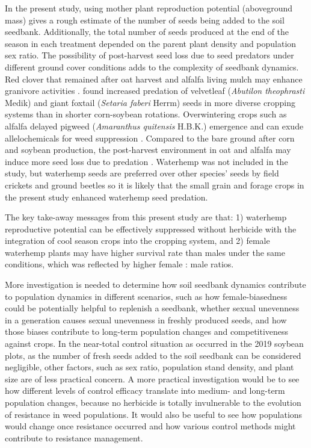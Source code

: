 \documentclass[utf8]{frontiersSCNS}
\begin{document}
In the present study, using mother plant reproduction potential (aboveground mass) gives a rough estimate of the number of seeds being added to the soil seedbank. Additionally, the total number of seeds produced at the end of the season in each treatment depended on the parent plant density and population sex ratio. The possibility of post-harvest seed loss due to seed predators under different ground cover conditions adds to the complexity of seedbank dynamics. Red clover that remained after oat harvest and alfalfa living mulch may enhance granivore activities \citep{davisCroppingSystemEffects2003, gallandtEffectCovercroppingSystems2005}. \citet{heggenstallerSeasonalPatternsPostdispersal2006} found increased predation of velvetleaf (\emph{Abutilon theophrasti} Medik) and giant foxtail (\emph{Setaria faberi} Herrm) seeds in more diverse cropping systems than in shorter corn-soybean rotations. Overwintering crops such as alfalfa delayed pigweed (\emph{Amaranthus quitensis} H.B.K.) emergence \citep{huarteUnderstandingMechanismsReduced2003} and can exude allelochemicals for weed suppression \citep{millerAllelopathyForageCrop1996}. Compared to the bare ground after corn and soybean production, the post-harvest environment in oat and alfalfa may induce more seed loss due to predation \citep{gallandtEffectCovercroppingSystems2005}. Waterhemp was not included in the \citet{heggenstallerSeasonalPatternsPostdispersal2006} study, but waterhemp seeds are preferred over other species' seeds by field crickets and ground beetles \citep{vanderlaatPostdispersalWeedSeed2015} so it is likely that the small grain and forage crops in the present study enhanced waterhemp seed predation.  

The key take-away messages from this present study are that: 1) waterhemp reproductive potential can be effectively suppressed without herbicide with the integration of cool season crops into the cropping system, and 2) female waterhemp plants may have higher survival rate than males under the same conditions, which was reflected by higher female : male ratios.  

More investigation is needed to determine how soil seedbank dynamics contribute to population dynamics in different scenarios, such as how female-biasedness could be potentially helpful to replenish a seedbank, whether sexual unevenness in a generation causes sexual unevenness in freshly produced seeds, and how those biases contribute to long-term population changes and competitiveness against crops. In the near-total control situation as occurred in the 2019 soybean plots, as the number of fresh seeds added to the soil seedbank can be considered negligible, other factors, such as sex ratio, population stand density, and plant size are of less practical concern. A more practical investigation would be to see how different levels of control efficacy translate into medium- and long-term population changes, because no herbicide is totally invulnerable to the evolution of resistance in weed populations. It would also be useful to see how populations would change once resistance occurred and how various control methods might contribute to resistance management.
\end{document}
